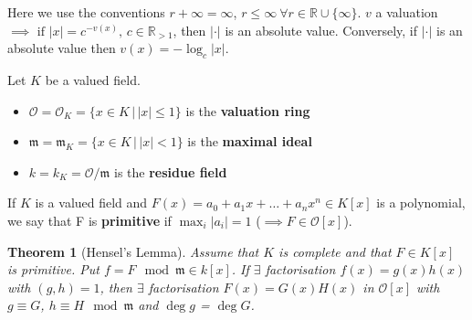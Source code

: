\documentclass[a4paper]{article}
\newtheorem{theorem}[definition]{Theorem}
\newcommand*\abs[1]{\left|#1\right|}
\begin{document}
Here we use the conventions $r+\infty = \infty$, $r \leq \infty\ \forall r \in \mathbb{R} \cup \{\infty\}$. $v$ a valuation $\implies \text{ if } \abs{x} = c^{-v(x)},\, c \in \mathbb{R}_{>1}$, then $\abs{\cdot}$ is an absolute value. Conversely, if $\abs{\cdot}$ is an absolute value then $v(x)=-\log_c\abs{x}$.

Let $K$ be a valued field.
\begin{itemize}
	\item $\mathcal{O} = \mathcal{O}_K = \{x \in K \,|\, \abs{x} \leq 1\}$ is the \textbf{valuation ring}
	\item $\mathfrak{m} = \mathfrak{m}_K = \{x \in K \,|\, \abs{x} < 1\}$ is the \textbf{maximal ideal}
	\item $k = k_K = \mathcal{O}/\mathfrak{m}$ is the \textbf{residue field}
\end{itemize}

If $K$ is a valued field and $F(x)=a_0 + a_1 x + \dots + a_n x^n \in K[x]$ is a polynomial, we say that F is \textbf{primitive} if $\max_i \abs{a_i} = 1$ ($\implies F \in \mathcal{O}[x]$).

\begin{theorem}[Hensel's Lemma]
	Assume that $K$ is complete and that $F \in K[x]$ is primitive. Put $f = F \mod \mathfrak{m} \in k[x]$. If $\exists$ factorisation $f(x)=g(x)h(x)$ with $(g,h)=1$, then $\exists$ factorisation $F(x)=G(x)H(x)$ in $\mathcal{O}[x]$ with $g \equiv G$, $h \equiv H \mod \mathfrak{m}$ and $\deg g$ = $\deg G$.
\end{theorem}
\end{document}
